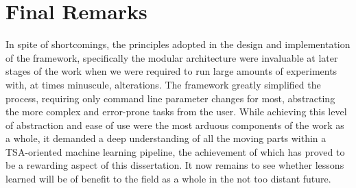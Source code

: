 \documentclass[../../fyp.tex]{subfiles}
\begin{document}
\section{Final Remarks}
In spite of shortcomings, the principles adopted in the design and implementation of the framework, specifically the modular architecture were invaluable at later stages of the work when we were required to run large amounts of experiments with, at times minuscule, alterations. The framework greatly simplified the process, requiring only command line parameter changes for most, abstracting the more complex and error-prone tasks from the user. While achieving this level of abstraction and ease of use were the most arduous components of the work as a whole, it demanded a deep understanding of all the moving parts within a TSA-oriented machine learning pipeline, the achievement of which has proved to be a rewarding aspect of this dissertation. It now remains to see whether lessons learned will be of benefit to the field as a whole in the not too distant future.

% 

% 
\end{document}
